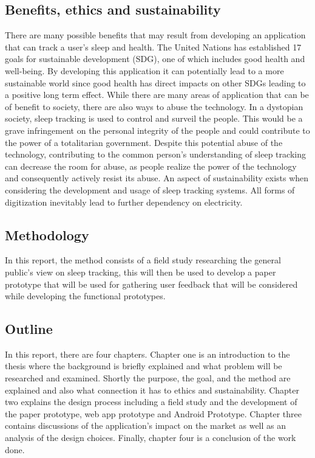 \documentclass{article}
\begin{document}
\subsection{Benefits, ethics and sustainability}
There are many possible benefits that may result from developing an application that can track a user's sleep and health. The United Nations has established 17 goals for sustainable development (SDG), one of which includes good health and well-being. By developing this application it can potentially lead to a more sustainable world since good health has direct impacts on other SDGs leading to a positive long term effect. While there are many areas of application that can be of benefit to society, there are also ways to abuse the technology. In a dystopian society, sleep tracking is used to control and surveil the people. This would be a grave infringement on the personal integrity of the people and could contribute to the power of a totalitarian government. Despite this potential abuse of the technology, contributing to the common person’s understanding of sleep tracking can decrease the room for abuse, as people realize the power of the technology and consequently actively resist its abuse. An aspect of sustainability exists when considering the development and usage of sleep tracking systems. All forms of digitization inevitably lead to further dependency on electricity.\cite{noauthor_17_nodate}

\subsection{Methodology}
In this report, the method consists of a field study researching the general public’s view on sleep tracking, this will then be used to develop a paper prototype that will be used for gathering user feedback that will be considered while developing the functional prototypes. 

\subsection{Outline}
In this report, there are four chapters.
Chapter one is an introduction to the thesis where the background is briefly explained and what problem will be researched and examined. Shortly the purpose, the goal, and the method are explained and also what connection it has to ethics and sustainability. Chapter two explains the design process including a field study and the development of the paper prototype, web app prototype and Android Prototype. Chapter three contains discussions of the application’s impact on the market as well as an analysis of the design choices. Finally, chapter four is a conclusion of the work done.
\end{document}
